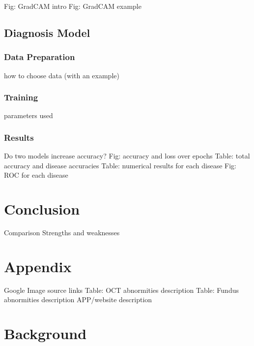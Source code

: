 \documentclass{article}
\begin{document}
				Fig: GradCAM intro
				Fig: GradCAM example
		
	\subsection{Diagnosis Model}
	
		\subsubsection{Data Preparation}
		
			how to choose data (with an example)
		
		\subsubsection{Training}
		
			parameters used
		
		\subsubsection{Results}
			
			Do two models increase accuracy?
			Fig: accuracy and loss over epochs
			Table: total accuracy and disease accuracies
			Table: numerical results for each disease
			Fig: ROC for each disease
	
	\section{Conclusion}
	
		Comparison
		Strengths and weaknesses
	
	\section{Appendix}
	
		Google Image source links
		Table: OCT abnormities description
		Table: Fundus abnormities description
		APP/website description
	
	
	
	
	
	
	\section{Background}
		
\end{document}
